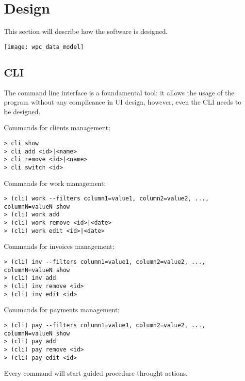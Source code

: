

\graphicspath{ {./images/} }

\section{Design}
This section will describe how the software is designed.

\texttt{[image: wpc\_data\_model]}

\subsection{CLI}
The command line interface is a foundamental tool: it allows the usage of the program without any complicance in UI design, however, even the CLI needs to be designed.

Commands for clients management:
\begin{lstlisting}
> cli show
> cli add <id>|<name>
> cli remove <id>|<name>
> cli switch <id>
\end{lstlisting}

Commands for work management:
\begin{lstlisting}
> (cli) work --filters column1=value1, column2=value2, ..., columnN=valueN show
> (cli) work add
> (cli) work remove <id>|<date>
> (cli) work edit <id>|<date>
\end{lstlisting}

Commands for invoices management:
\begin{lstlisting}
> (cli) inv --filters column1=value1, column2=value2, ..., columnN=valueN show
> (cli) inv add
> (cli) inv remove <id>
> (cli) inv edit <id>
\end{lstlisting}

Commands for payments management:
\begin{lstlisting}
> (cli) pay --filters column1=value1, column2=value2, ..., columnN=valueN show
> (cli) pay add
> (cli) pay remove <id>
> (cli) pay edit <id>
\end{lstlisting}

Every command will start guided procedure throught actions.

